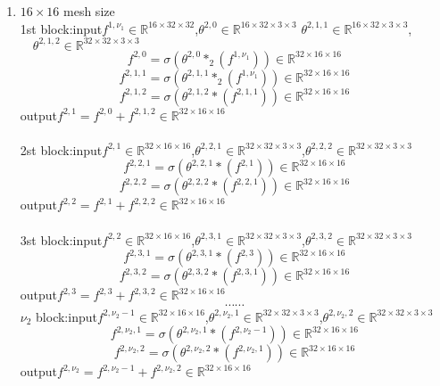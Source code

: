 \begin{enumerate}
\item $16\times 16$ mesh size\\
1st block:\quad input\quad $f^{1,\nu_1}\in\mathbb{R}^{16\times 32\times 32}$,\quad$\theta^{2,0} \in \mathbb{R}^{16\times 32\times 3\times 3}$ $\theta^{2,1,1} \in \mathbb{R}^{16\times 32\times 3\times 3}$,$\quad \theta^{2,1,2} \in \mathbb{R}^{32\times 32\times 3\times 3}$
$$f^{2,0}=\sigma (\theta^{2,0} \ast_2 (f^{1,\nu_1}))\in \mathbb{R}^{32\times 16\times 16}$$
$$f^{2,1,1}=\sigma (\theta^{2,1,1} \ast_2 (f^{1,\nu_1}))\in \mathbb{R}^{32\times 16\times 16}$$
$$f^{2,1,2}=\sigma (\theta^{2,1,2} \ast (f^{2,1,1}))\in \mathbb{R}^{32\times 16\times 16}$$
\quad\quad\quad\quad\quad output\quad $f^{2,1}=f^{2,0}+f^{2,1,2} \in \mathbb{R}^{32\times 16\times 16}$
\\ \hspace*{\fill} \\
2st block:\quad input\quad $f^{2,1}\in \mathbb{R}^{32\times 16\times 16}$,\quad $\theta^{2,2,1} \in \mathbb{R}^{32\times 32\times 3\times 3}$,\quad $\theta^{2,2,2} \in \mathbb{R}^{32\times 32\times 3\times 3}$
$$f^{2,2,1}=\sigma (\theta^{2,2,1} \ast (f^{2,1}))\in \mathbb{R}^{32\times 16\times 16}$$
$$f^{2,2,2}=\sigma (\theta^{2,2,2} \ast (f^{2,2,1}))\in \mathbb{R}^{32\times 16\times 16}$$
\quad\quad\quad\quad\quad output\quad $f^{2,2}=f^{2,1}+f^{2,2,2} \in \mathbb{R}^{32\times 16\times 16}$
\\ \hspace*{\fill} \\
3st block:\quad input\quad $f^{2,2}\in \mathbb{R}^{32\times 16\times 16}$,\quad $\theta^{2,3,1} \in \mathbb{R}^{32\times 32\times 3\times 3}$,\quad $\theta^{2,3,2} \in \mathbb{R}^{32\times 32\times 3\times 3}$
$$f^{2,3,1}=\sigma (\theta^{2,3,1} \ast (f^{2,3}))\in \mathbb{R}^{32\times 16\times 16}$$
$$f^{2,3,2}=\sigma (\theta^{2,3,2} \ast (f^{2,3,1}))\in \mathbb{R}^{32\times 16\times 16}$$
\quad\quad\quad\quad\quad output\quad $f^{2,3}=f^{2,3}+f^{2,3,2} \in \mathbb{R}^{32\times 16\times 16}$
$$\cdots\cdots$$
$\nu_2$ block:\quad input\quad $f^{2,\nu_2-1}\in \mathbb{R}^{32\times 16\times 16}$,\quad $\theta^{2,\nu_2,1} \in \mathbb{R}^{32\times 32\times 3\times 3}$,\quad $\theta^{2,\nu_2,2} \in \mathbb{R}^{32\times 32\times 3\times 3}$
$$f^{2,\nu_2,1}=\sigma (\theta^{2,\nu_2,1} \ast (f^{2,\nu_2-1}))\in \mathbb{R}^{32\times 16\times 16}$$
$$f^{2,\nu_2,2}=\sigma (\theta^{2,\nu_2,2} \ast (f^{2,\nu_2,1}))\in \mathbb{R}^{32\times 16\times 16}$$
\quad\quad\quad\quad\quad output\quad $f^{2,\nu_2}=f^{2,\nu_2-1}+f^{2,\nu_2,2} \in \mathbb{R}^{32\times 16\times 16}$

\end{enumerate}
